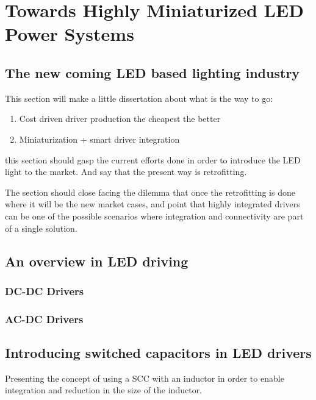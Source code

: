 \part{Towards Highly Miniaturized LED Power Systems }
\label{ch:twrd_HMLED}

\chapter{The new coming LED based lighting industry}
This section will make a little dissertation about what is the way to go:
\begin{enumerate}
  \item Cost driven driver production the cheapest the better
  \item Miniaturization + smart driver integration
\end{enumerate}

this section should gasp the current efforts done in order to introduce the LED light to the market. And say that the present way is retrofitting.

The section should close facing the dilemma that once the retrofitting is done where it will be the new market cases, and point that highly integrated drivers
can be one of the possible scenarios where integration and connectivity are part of a single solution.

\chapter{An overview in LED driving}
\section{DC-DC Drivers}
\section{AC-DC Drivers}

\chapter{Introducing switched capacitors in LED drivers}
Presenting the concept of using a SCC with an inductor in order to enable integration and reduction in the size of the inductor.



